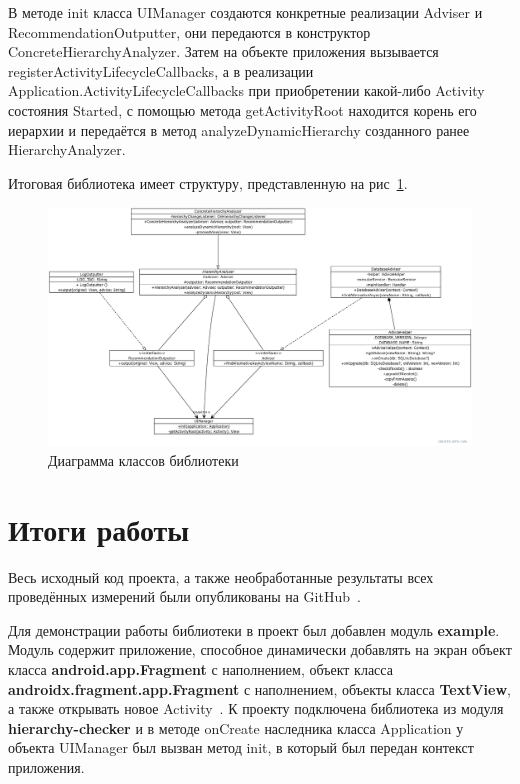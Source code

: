 \documentclass[a4paper,14pt]{extarticle} %
\begin{document}
	В методе init класса UIManager создаются конкретные реализации Adviser и RecommendationOutputter, они передаются в конструктор ConcreteHierarchyAnalyzer. Затем на объекте приложения вызывается registerActivityLifecycleCallbacks, а в реализации Application.ActivityLifecycleCallbacks при приобретении какой-либо Activity состояния Started, с помощью метода getActivityRoot находится корень его иерархии и передаётся в метод analyzeDynamicHierarchy созданного ранее HierarchyAnalyzer.
	
	Итоговая библиотека имеет структуру, представленную на рис~\ref{fig:uml}.
	
	\begin{figure}[htb]
		\includegraphics[width=\textwidth]{uml}
		\caption{Диаграмма классов библиотеки}
		\label{fig:uml}
	\end{figure}
	
	\newpage
	\section{Итоги работы}
	
	Весь исходный код проекта, а также необработанные результаты всех проведённых измерений были опубликованы на GitHub~\parencite{GitHub}.
	
	Для демонстрации работы библиотеки в проект был добавлен модуль \textbf{example}. Модуль содержит приложение, способное динамически добавлять на экран объект класса \textbf{android.app.Fragment} с наполнением, объект класса \textbf{androidx.fragment.app.Fragment} с наполнением, объекты класса \textbf{TextView}, а также открывать новое Activity~\ris{\ref{fig:example}}. К проекту подключена библиотека из модуля \textbf{hierarchy-checker} и в методе onCreate наследника класса Application у объекта UIManager был вызван метод init, в который был передан контекст приложения.
	
\end{document}
